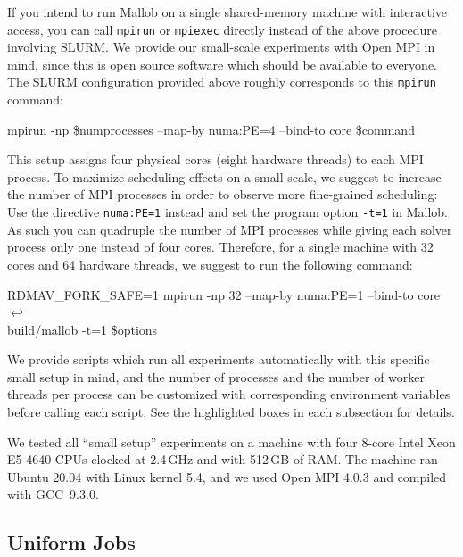\documentclass[runningheads]{article}
\newcommand{\CR}{{\tiny$\hookleftarrow$}}
\numberwithin{dummy}{subsection}
\begin{document}
If you intend to run Mallob on a single shared-memory machine with interactive access, you can call \texttt{mpirun} or \texttt{mpiexec} directly instead of the above procedure involving SLURM.
We provide our small-scale experiments with Open MPI in mind, since this is open source software which should be available to everyone.
The SLURM configuration provided above roughly corresponds to this \texttt{mpirun} command:

\begin{ttfenv}
mpirun -np \$numprocesses --map-by numa:PE=4 --bind-to core \$command
\end{ttfenv}

This setup assigns four physical cores (eight hardware threads) to each MPI process.
To maximize scheduling effects on a small scale, we suggest to increase the number of MPI processes in order to observe more fine-grained scheduling: 
Use the directive \texttt{numa:PE=1} instead and set the program option \texttt{-t=1} in Mallob.
As such you can quadruple the number of MPI processes while giving each solver process only one instead of four cores.
Therefore, for a single machine with 32 cores and 64 hardware threads, we suggest to run the following command:

\begin{ttfenv}
RDMAV\_FORK\_SAFE=1 mpirun -np 32 --map-by numa:PE=1 --bind-to core \CR\\
\hspace*{0.3cm}build/mallob -t=1 \$options
\end{ttfenv}

We provide scripts which run all experiments automatically with this specific small setup in mind, and the number of processes and the number of worker threads per process can be customized with corresponding environment variables before calling each script. 
See the highlighted boxes in each subsection for details.

We tested all ``small setup'' experiments on a machine with four 8-core Intel Xeon E5-4640 CPUs clocked at 2.4\,GHz and with 512\,GB of RAM.
The machine ran Ubuntu 20.04 with Linux kernel 5.4, and we used Open MPI 4.0.3 and compiled with GCC~9.3.0.








\subsection{Uniform Jobs}
\label{sec:uniform-jobs}
\end{document}
